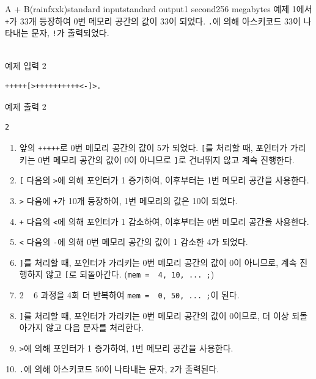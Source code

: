 \begin{problem}{A + B(rainfxxk)}{standard input}{standard output}{1 second}{256 megabytes}
예제 1에서 \texttt{+}가 33개 등장하여 0번 메모리 공간의 값이 33이 되었다. \texttt{.}에 의해 아스키코드 33이 나타내는 문자, \texttt{!}가 출력되었다.

\\

예제 입력 2

\begin{lstlisting}
+++++[>++++++++++<-]>.
\end{lstlisting}

예제 출력 2

\begin{lstlisting}
2
\end{lstlisting}
\begin{enumerate}
\item 
앞의 \texttt{+++++}로 0번 메모리 공간의 값이 5가 되었다. \texttt{[}를 처리할 때, 포인터가 가리키는 0번 메모리 공간의 값이 0이 아니므로 \texttt{]}로 건너뛰지 않고 계속 진행한다.


\item 
\texttt{[} 다음의 \texttt{>}에 의해 포인터가 1 증가하여, 이후부터는 1번 메모리 공간을 사용한다.


\item 
\texttt{>} 다음에 \texttt{+}가 10개 등장하여, 1번 메모리의 값은 10이 되었다.


\item 
\texttt{+} 다음의 \texttt{<}에 의해 포인터가 1 감소하여, 이후부터는 0번 메모리 공간을 사용한다.


\item 
\texttt{<} 다음의 \texttt{-}에 의해 0번 메모리 공간의 값이 1 감소한 4가 되었다.


\item 
\texttt{]}를 처리할 때, 포인터가 가리키는 0번 메모리 공간의 값이 0이 아니므로, 계속 진행하지 않고 \texttt{[}로 되돌아간다. (\texttt{mem = { 4, 10, ... };})


\item 
2 ~ 6 과정을 4회 더 반복하여 \texttt{mem = { 0, 50, ... };}이 된다.


\item 
\texttt{]}를 처리할 때, 포인터가 가리키는 0번 메모리 공간의 값이 0이므로, 더 이상 되돌아가지 않고 다음 문자를 처리한다.


\item 
\texttt{>}에 의해 포인터가 1 증가하여, 1번 메모리 공간을 사용한다.


\item 
\texttt{.}에 의해 아스키코드 50이 나타내는 문자, \texttt{2}가 출력된다.



\end{enumerate}
\end{problem}

